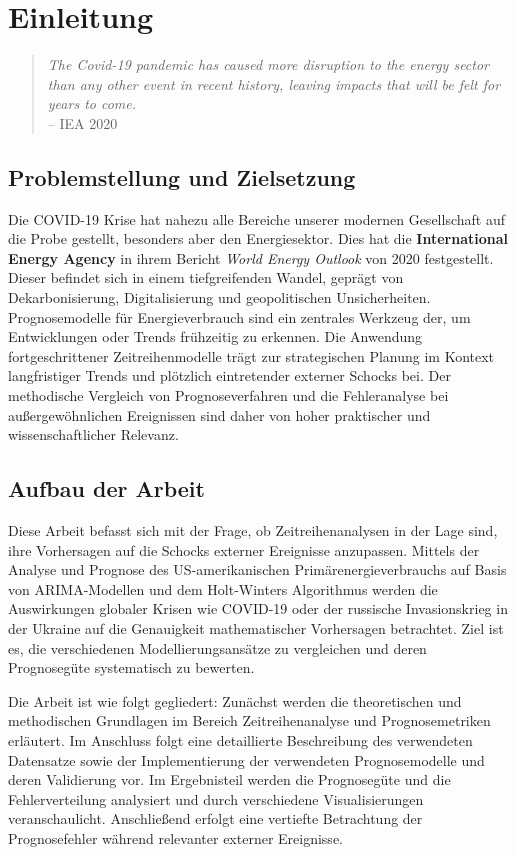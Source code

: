 \renewcommand{\figurename}{Abb.}

\section{Einleitung}
\label{sec:einleitung}

\begin{quote}
\textit{%
The Covid-19 pandemic has caused more disruption to the energy sector than any other event in recent history, leaving impacts that will be felt for years to come.
}\\
-- IEA 2020~\cite{iea2020}
\end{quote}

\subsection{Problemstellung und Zielsetzung}
\label{subsec:problemstellung}

Die COVID-19 Krise hat nahezu alle Bereiche unserer modernen Gesellschaft auf die Probe gestellt, besonders aber den Energiesektor. Dies hat die \textbf{International Energy Agency} in ihrem Bericht \textit{World Energy Outlook} von 2020 festgestellt. Dieser befindet sich in einem tiefgreifenden Wandel, geprägt von Dekarbonisierung, Digitalisierung und geopolitischen Unsicherheiten. Prognosemodelle für Energieverbrauch sind ein zentrales Werkzeug der, um Entwicklungen oder Trends frühzeitig zu erkennen. Die Anwendung fortgeschrittener Zeitreihenmodelle trägt zur strategischen Planung im Kontext langfristiger Trends und plötzlich eintretender externer Schocks bei. Der methodische Vergleich von Prognoseverfahren und die Fehleranalyse bei außergewöhnlichen Ereignissen sind daher von hoher praktischer und wissenschaftlicher Relevanz.


\subsection{Aufbau der Arbeit}
\label{subsec:aufbau}

Diese Arbeit befasst sich mit der Frage, ob Zeitreihenanalysen in der Lage sind, ihre Vorhersagen auf die Schocks externer Ereignisse anzupassen. Mittels der Analyse und Prognose des US-amerikanischen Primärenergieverbrauchs auf Basis von ARIMA-Modellen und dem Holt-Winters Algorithmus werden die Auswirkungen globaler Krisen wie COVID-19 oder der russische Invasionskrieg in der Ukraine auf die Genauigkeit mathematischer Vorhersagen betrachtet. Ziel ist es, die verschiedenen Modellierungsansätze zu vergleichen und deren Prognosegüte systematisch zu bewerten.

Die Arbeit ist wie folgt gegliedert: Zunächst werden die theoretischen und methodischen Grundlagen im Bereich Zeitreihenanalyse und Prognosemetriken erläutert. Im Anschluss folgt eine detaillierte Beschreibung des verwendeten Datensatze sowie der Implementierung der verwendeten Prognosemodelle und deren Validierung vor. Im Ergebnisteil werden die Prognosegüte und die Fehlerverteilung analysiert und durch verschiedene Visualisierungen veranschaulicht. Anschließend erfolgt eine vertiefte Betrachtung der Prognosefehler während relevanter externer Ereignisse.
